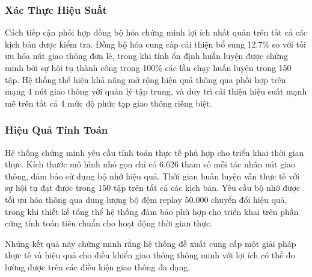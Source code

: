 \subsubsection{Xác Thực Hiệu Suất}

Cách tiếp cận phối hợp đồng bộ hóa chứng minh lợi ích nhất quán trên tất cả các kịch bản được kiểm tra. 
Đồng bộ hóa cung cấp cải thiện bổ sung 12.7\% so với tối ưu hóa nút giao thông đơn lẻ, trong khi tính ổn định 
huấn luyện được chứng minh bởi sự hội tụ thành công trong 100\% các lần chạy huấn luyện trong 150 tập. 
Hệ thống thể hiện khả năng mở rộng hiệu quả thông qua phối hợp trên mạng 4 nút giao thông với quản lý tập trung, 
và duy trì cải thiện hiệu suất mạnh mẽ trên tất cả 4 mức độ phức tạp giao thông riêng biệt.

\subsubsection{Hiệu Quả Tính Toán}

Hệ thống chứng minh yêu cầu tính toán thực tế phù hợp cho triển khai thời gian thực. Kích thước mô hình 
nhỏ gọn chỉ có 6.626 tham số mỗi tác nhân nút giao thông, đảm bảo sử dụng bộ nhớ hiệu quả. Thời gian huấn luyện 
vẫn thực tế với sự hội tụ đạt được trong 150 tập trên tất cả các kịch bản. Yêu cầu bộ nhớ được tối ưu hóa 
thông qua dung lượng bộ đệm replay 50.000 chuyển đổi hiệu quả, trong khi thiết kế tổng thể hệ thống đảm bảo 
phù hợp cho triển khai trên phần cứng tính toán tiêu chuẩn cho hoạt động thời gian thực.

Những kết quả này chứng minh rằng hệ thống đề xuất cung cấp một giải pháp thực tế và hiệu quả cho điều khiển 
giao thông thông minh với lợi ích có thể đo lường được trên các điều kiện giao thông đa dạng.
